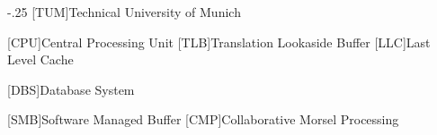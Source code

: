 \documentclass[headsepline,footsepline,footinclude=false,oneside,fontsize=11pt,paper=a4,listof=totoc,bibliography=totoc]{scrbook} %
\begin{document}


\frontmatter{}





\tableofcontents{}

\mainmatter{}







\appendix{}


\begin{acronym}
  \itemsep-.25\baselineskip
  [TUM]{Technical University of Munich}

  [CPU]{Central Processing Unit}
  [TLB]{Translation Lookaside Buffer}
  [LLC]{Last Level Cache}

  [DBS]{Database System}

  [SMB]{Software Managed Buffer}
  [CMP]{Collaborative Morsel Processing}
\end{acronym}

\newpage
{}
\listofalgorithms{}
\listoffigures{}
\listoftables{}
\printbibliography{}
\end{document}
